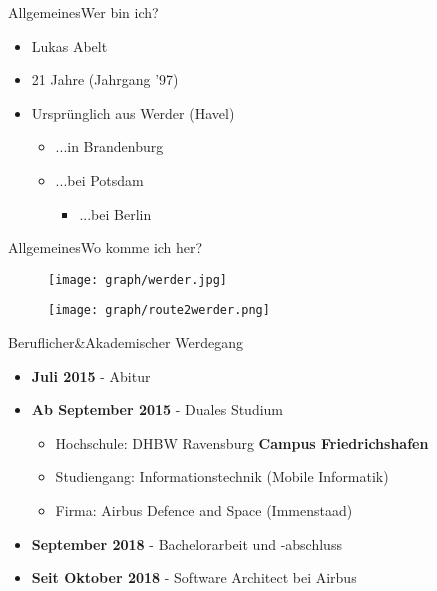 \begin{frame}{Allgemeines}{Wer bin ich?}
		\begin{itemize}
			\item Lukas Abelt
			\item <2-> 21 Jahre (Jahrgang '97)
			\item <3-> Ursprünglich aus Werder (Havel)
			\begin{itemize}
				\item <4->...in Brandenburg
				\item <5->...bei Potsdam
				\begin{itemize}
					\item <6->...bei Berlin
				\end{itemize}
			\end{itemize}
		\end{itemize}
	\end{frame}
	
	\begin{frame}{Allgemeines}{Wo komme ich her?}
		\begin{figure}
		\centering
			\begin{minipage}{0.7\textwidth}
			\centering
			\texttt{[image: graph/werder.jpg]}
			\end{minipage}%
			\begin{minipage}{0.3\textwidth}
			\centering
			\texttt{[image: graph/route2werder.png]}
			\end{minipage}
		\end{figure}
	\end{frame}

	\begin{frame}{Beruflicher\&Akademischer Werdegang}{}
		\begin{itemize}
			\item \textbf{Juli 2015} - Abitur
			\item \textbf{Ab September 2015} - Duales Studium
			\begin{itemize}
				\item Hochschule: DHBW Ravensburg \textbf{Campus Friedrichshafen}
				\item Studiengang: Informationstechnik (Mobile Informatik)
				\item Firma: Airbus Defence and Space (Immenstaad)
			\end{itemize}
			\item \textbf{September 2018} - Bachelorarbeit und -abschluss
			\item \textbf{Seit Oktober 2018} - Software Architect bei Airbus
		\end{itemize}
	\end{frame}
	
